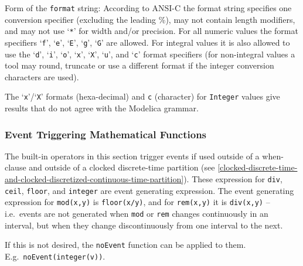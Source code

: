 \begin{operatordefinition*}[String]
\begin{semantics}
Form of the \lstinline!format! string:  According to ANSI-C the format string specifies one conversion specifier (excluding the leading \%), may not contain length modifiers, and may not use
`\lstinline!*!' for width and/or precision.  For all numeric values the format specifiers `\lstinline!f!', `\lstinline!e!', `\lstinline!E!', `\lstinline!g!', `\lstinline!G!' are allowed.  For
integral values it is also allowed to use the `\lstinline!d!', `\lstinline!i!', `\lstinline!o!', `\lstinline!x!', `\lstinline!X!', `\lstinline!u!', and `\lstinline!c!' format specifiers (for
non-integral values a tool may round, truncate or use a different format if the integer conversion characters are used).

The `\lstinline!x!'/`\lstinline!X!' formats (hexa-decimal) and \lstinline!c! (character) for \lstinline!Integer! values give results that do not agree with the Modelica grammar.
\end{semantics}
\end{operatordefinition*}


\subsubsection{Event Triggering Mathematical Functions}\label{event-triggering-mathematical-functions}

The built-in operators in this section trigger events if used outside of
a when-clause and outside of a clocked discrete-time partition (see
\cref{clocked-discrete-time-and-clocked-discretized-continuous-time-partition}).
These expression for \lstinline!div!, \lstinline!ceil!, \lstinline!floor!, and \lstinline!integer! are
event generating expression. The event generating expression for
\lstinline!mod(x,y)! is \lstinline!floor(x/y)!, and for \lstinline!rem(x,y)! it is \lstinline!div(x,y)! -- i.e.\ events
are not generated when \lstinline!mod! or \lstinline!rem! changes continuously in an interval,
but when they change discontinuously from one interval to the next.

\begin{nonnormative}
If this is not desired, the \lstinline!noEvent! function can be applied to them.  E.g.\ \lstinline!noEvent(integer(v))!.
\end{nonnormative}

